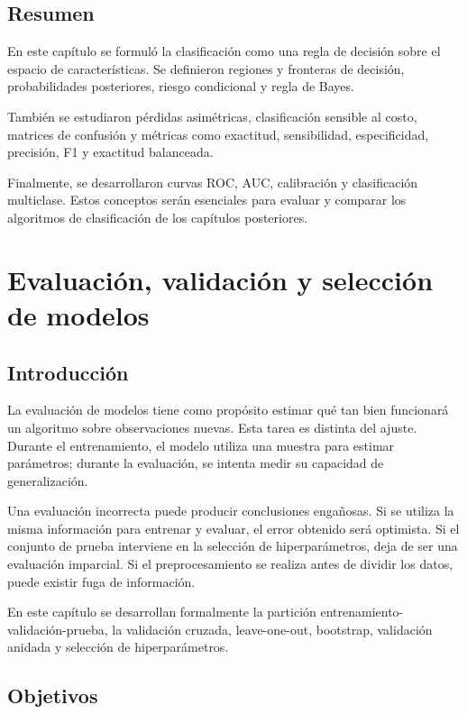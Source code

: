 \documentclass[
  spanish,
  11pt,
  letterpaper,
  DIV=11,
  numbers=noendperiod]{scrreprt}
\theoremstyle{definition}
\theoremstyle{plain}
\theoremstyle{definition}
\theoremstyle{remark}
\begin{document}
\section{Resumen}\label{resumen-5}

En este capítulo se formuló la clasificación como una regla de decisión
sobre el espacio de características. Se definieron regiones y fronteras
de decisión, probabilidades posteriores, riesgo condicional y regla de
Bayes.

También se estudiaron pérdidas asimétricas, clasificación sensible al
costo, matrices de confusión y métricas como exactitud, sensibilidad,
especificidad, precisión, F1 y exactitud balanceada.

Finalmente, se desarrollaron curvas ROC, AUC, calibración y
clasificación multiclase. Estos conceptos serán esenciales para evaluar
y comparar los algoritmos de clasificación de los capítulos posteriores.

\chapter{Evaluación, validación y selección de
modelos}\label{sec-evaluacion-modelos}

\section{Introducción}\label{introducciuxf3n-7}

La evaluación de modelos tiene como propósito estimar qué tan bien
funcionará un algoritmo sobre observaciones nuevas. Esta tarea es
distinta del ajuste. Durante el entrenamiento, el modelo utiliza una
muestra para estimar parámetros; durante la evaluación, se intenta medir
su capacidad de generalización.

Una evaluación incorrecta puede producir conclusiones engañosas. Si se
utiliza la misma información para entrenar y evaluar, el error obtenido
será optimista. Si el conjunto de prueba interviene en la selección de
hiperparámetros, deja de ser una evaluación imparcial. Si el
preprocesamiento se realiza antes de dividir los datos, puede existir
fuga de información.

En este capítulo se desarrollan formalmente la partición
entrenamiento-validación-prueba, la validación cruzada, leave-one-out,
bootstrap, validación anidada y selección de hiperparámetros.

\section{Objetivos}\label{objetivos-6}
\end{document}
